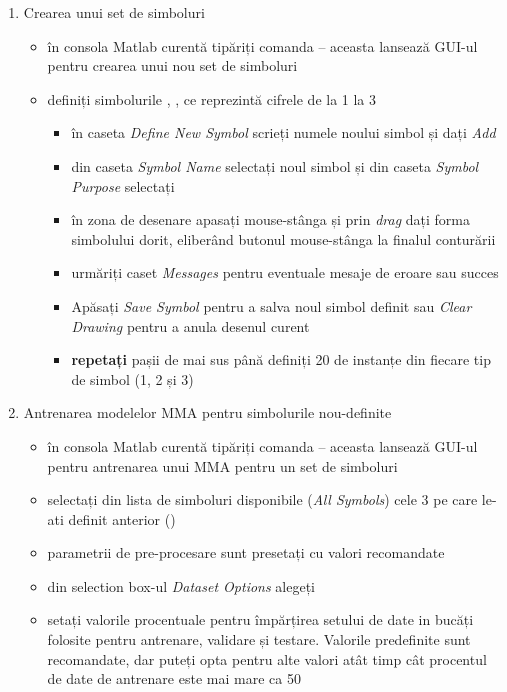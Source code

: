 \documentclass[12pt]{article}
\begin{document}
\begin{enumerate}
	\item Crearea unui set de simboluri
		\begin{itemize}
			\item în consola Matlab curentă tipăriți comanda  -- aceasta lansează GUI-ul 
			pentru crearea unui nou set de simboluri
			\item definiți simbolurile , ,  ce reprezintă cifrele de la 1 la 3
				\begin{itemize}
					\item în caseta \emph{Define New Symbol} scrieți numele noului simbol și dați \emph{Add}
					\item din caseta \emph{Symbol Name} selectați noul simbol și din caseta \emph{Symbol Purpose} 
					selectați 
					\item în zona de desenare apasați mouse-stânga și prin \emph{drag} dați forma simbolului dorit, eliberând butonul mouse-stânga la finalul conturării
					\item urmăriți caset \emph{Messages} pentru eventuale mesaje de eroare sau succes
					\item Apăsați \emph{Save Symbol} pentru a salva noul simbol definit sau \emph{Clear Drawing} pentru a anula desenul curent
					\item \textbf{repetați} pașii de mai sus până definiți 20 de instanțe din fiecare tip de simbol
					 (1, 2 și 3)
				\end{itemize}
		\end{itemize}
	\item Antrenarea modelelor MMA pentru simbolurile nou-definite
		\begin{itemize}
			\item în consola Matlab curentă tipăriți comanda  -- aceasta lansează GUI-ul 
			pentru antrenarea unui MMA pentru un set de simboluri
			\item selectați din lista de simboluri disponibile (\emph{All Symbols}) cele 3 pe care le-ati definit 
			anterior ()
			\item parametrii de pre-procesare sunt presetați cu valori recomandate
			\item din selection box-ul \emph{Dataset Options} alegeți 
			\item setați valorile procentuale pentru împărțirea setului de date in bucăți folosite pentru antrenare, validare și testare. Valorile predefinite sunt recomandate, dar puteți opta pentru alte valori atât timp cât procentul de date de antrenare este mai mare ca 50

\end{itemize}
\end{enumerate}
\end{document}
